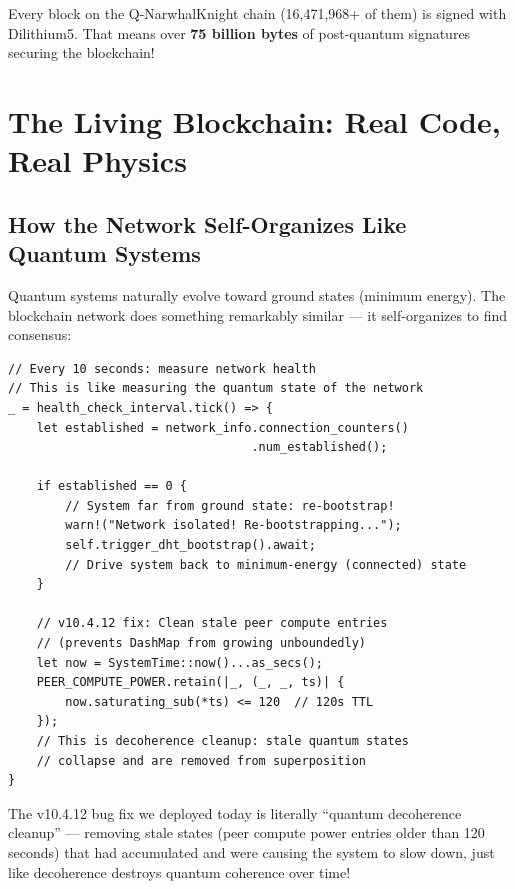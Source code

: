 \documentclass[11pt,a4paper]{article}
\begin{document}
Every block on the Q-NarwhalKnight chain (16,471,968+ of them) is signed with Dilithium5. That means over \textbf{75 billion bytes} of post-quantum signatures securing the blockchain!

\section{The Living Blockchain: Real Code, Real Physics}

\subsection{How the Network Self-Organizes Like Quantum Systems}

Quantum systems naturally evolve toward ground states (minimum energy). The blockchain network does something remarkably similar --- it self-organizes to find consensus:

\begin{lstlisting}[caption={The health watchdog in unified\_network\_manager.rs --- self-organization like quantum ground state}]
// Every 10 seconds: measure network health
// This is like measuring the quantum state of the network
_ = health_check_interval.tick() => {
    let established = network_info.connection_counters()
                                  .num_established();

    if established == 0 {
        // System far from ground state: re-bootstrap!
        warn!("Network isolated! Re-bootstrapping...");
        self.trigger_dht_bootstrap().await;
        // Drive system back to minimum-energy (connected) state
    }

    // v10.4.12 fix: Clean stale peer compute entries
    // (prevents DashMap from growing unboundedly)
    let now = SystemTime::now()...as_secs();
    PEER_COMPUTE_POWER.retain(|_, (_, _, ts)| {
        now.saturating_sub(*ts) <= 120  // 120s TTL
    });
    // This is decoherence cleanup: stale quantum states
    // collapse and are removed from superposition
}
\end{lstlisting}

The v10.4.12 bug fix we deployed today is literally ``quantum decoherence cleanup'' --- removing stale states (peer compute power entries older than 120 seconds) that had accumulated and were causing the system to slow down, just like decoherence destroys quantum coherence over time!
\end{document}
